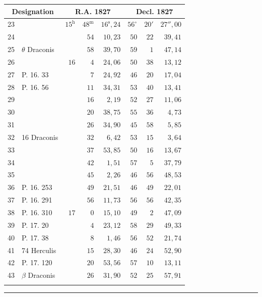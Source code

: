 \begin{center}
\begin{minipage}[t]{.49\textwidth}
{\begin{tabular}{r|l|rrr|rrr|}
\end{tabular}}\end{minipage}\hfill
\begin{minipage}[t]{.49\textwidth}\centering
{\scriptsize\setlength{\tabcolsep}{1.2pt}\renewcommand{\arraystretch}{1.2}\begin{tabular}{r|l|rrr|rrr}
\multicolumn{2}{c|}{Designation}&\multicolumn{3}{c|}{R.A. 1827}&\multicolumn{3}{c|}{Decl. 1827}\\\hline
23&&$15^{\mathrm h}$&$48^{\mathrm m}$&$16^{\mathrm s}{,}24$&$56^\circ$&$20'$&$27''{,}00$\\
24&&&$54$&$10{,}23$&$50$&$22$&$39{,}41$\\
25&$\theta$ Draconis&&$58$&$39{,}70$&$59$&$1$&$47{,}14$\\
26&&$16$&$4$&$24{,}06$&$50$&$38$&$13{,}12$\\
27&P. 16. 33&&$7$&$24{,}92$&$46$&$20$&$17{,}04$\\
28&P. 16. 56&&$11$&$34{,}31$&$53$&$40$&$13{,}41$\\
29&&&$16$&$2{,}19$&$52$&$27$&$11{,}06$\\
30&&&$20$&$38{,}75$&$55$&$36$&$4{,}73$\\
31&&&$26$&$34{,}90$&$45$&$58$&$5{,}85$\\
32&16 Draconis&&$32$&$6{,}42$&$53$&$15$&$3{,}64$\\
33&&&$37$&$53{,}85$&$50$&$16$&$13{,}67$\\
34&&&$42$&$1{,}51$&$57$&$5$&$37{,}79$\\
35&&&$45$&$2{,}26$&$46$&$56$&$48{,}53$\\
36&P. 16. 253&&$49$&$21{,}51$&$46$&$49$&$22{,}01$\\
37&P. 16. 291&&$56$&$11{,}73$&$56$&$56$&$42{,}35$\\
38&P. 16. 310&$17$&$0$&$15{,}10$&$49$&$2$&$47{,}09$\\
39&P. 17. 20&&$4$&$23{,}12$&$58$&$29$&$49{,}33$\\
40&P. 17. 38&&$8$&$1{,}46$&$56$&$52$&$21{,}74$\\
41&74 Herculis&&$15$&$28{,}30$&$46$&$24$&$52{,}90$\\
42&P. 17. 120&&$20$&$53{,}56$&$57$&$10$&$13{,}11$\\
43&$\beta$ Draconis&&$26$&$31{,}90$&$52$&$25$&$57{,}91$\\
&&&&&&&\\
\end{tabular}}\end{minipage}
\end{center}
\begin{center}\rule{.24\textwidth}{.4pt}\end{center}

